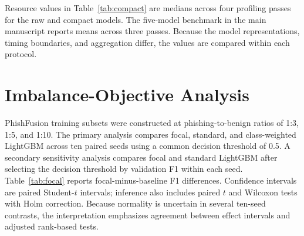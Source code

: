 \documentclass[10pt]{article}
\begin{document}
\begin{table}[ht]
\centering
\caption{{\color{supportingtext}Direct resource and model-fitting comparison of raw and compact LitePhish representations. FE denotes URL-to-feature extraction; Total includes FE, preprocessing, and prediction. Inference values are medians over four independent profiling passes.}}
\label{tab:compact}
\small
{}
\end{table}

{\color{supportingtext}Resource values in Table~\ref{tab:compact} are medians across four profiling passes for the raw and compact models. The five-model benchmark in the main manuscript reports means across three passes. Because the model representations, timing boundaries, and aggregation differ, the values are compared within each protocol.}

\section{Imbalance-Objective Analysis}

PhishFusion training subsets were constructed at phishing-to-benign ratios of 1:3, 1:5, and 1:10. The primary analysis compares focal, standard, and class-weighted LightGBM across ten paired seeds using a common decision threshold of 0.5. A secondary sensitivity analysis compares focal and standard LightGBM after selecting the decision threshold by validation F1 within each seed. Table~\ref{tab:focal} reports focal-minus-baseline F1 differences. Confidence intervals are paired Student-$t$ intervals; inference also includes paired $t$ and Wilcoxon tests with Holm correction. Because normality is uncertain in several ten-seed contrasts, the interpretation emphasizes agreement between effect intervals and adjusted rank-based tests.
\end{document}
